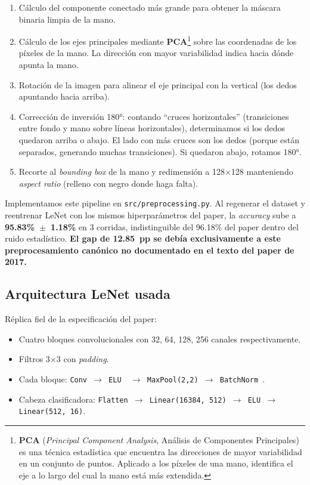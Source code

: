 \documentclass[a4paper,11pt]{article}
\begin{document}
\begin{enumerate}[itemsep=2pt]
    \item Cálculo del componente conectado más grande para obtener la máscara binaria limpia de la mano.
    \item Cálculo de los ejes principales mediante \textbf{PCA}\footnote{\textbf{PCA} (\textit{Principal Component Analysis}, Análisis de Componentes Principales) es una técnica estadística que encuentra las direcciones de mayor variabilidad en un conjunto de puntos. Aplicado a los píxeles de una mano, identifica el eje a lo largo del cual la mano está más extendida.} sobre las coordenadas de los píxeles de la mano. La dirección con mayor variabilidad indica hacia dónde apunta la mano.
    \item Rotación de la imagen para alinear el eje principal con la vertical (los dedos apuntando hacia arriba).
    \item Corrección de inversión 180°: contando ``cruces horizontales'' (transiciones entre fondo y mano sobre líneas horizontales), determinamos si los dedos quedaron arriba o abajo. El lado con más cruces son los dedos (porque están separados, generando muchas transiciones). Si quedaron abajo, rotamos 180°.
    \item Recorte al \textit{bounding box} de la mano y redimensión a 128$\times$128 manteniendo \textit{aspect ratio} (relleno con negro donde haga falta).
\end{enumerate}

Implementamos este pipeline en \texttt{src/preprocessing.py}. Al regenerar el dataset y reentrenar LeNet con los mismos hiperparámetros del paper, la \textit{accuracy} sube a \textbf{95.83\%~$\pm$~1.18\%} en 3 corridas, indistinguible del 96.18\% del paper dentro del ruido estadístico. \textbf{El gap de 12.85~pp se debía exclusivamente a este preprocesamiento canónico no documentado en el texto del paper de 2017.}

\subsection{Arquitectura LeNet usada}

Réplica fiel de la especificación del paper:
\begin{itemize}[itemsep=2pt]
    \item Cuatro bloques convolucionales con 32, 64, 128, 256 canales respectivamente.
    \item Filtros 3$\times$3 con \textit{padding}.
    \item Cada bloque: \texttt{Conv $\rightarrow$ ELU~\cite{clevert2015fast} $\rightarrow$ MaxPool(2,2) $\rightarrow$ BatchNorm~\cite{ioffe2015batch}}.
    \item Cabeza clasificadora: \texttt{Flatten $\rightarrow$ Linear(16384, 512) $\rightarrow$ ELU $\rightarrow$ Linear(512, 16)}.
\end{itemize}
\end{document}
